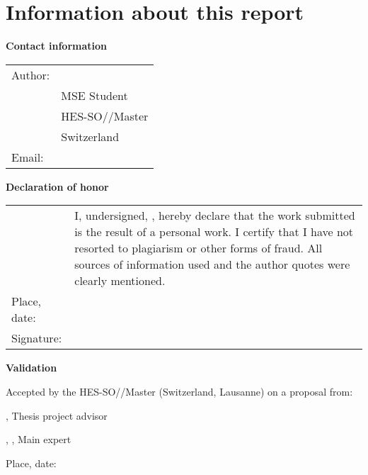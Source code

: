 \setlength{\parindent}{0pt}

\chapter*{Information about this report}

\vspace{\fill}

\textbf{Contact information}

\begin{tabularx}{\textwidth}{N{2.5cm}X}
	Author:	 & \Author \\
	& MSE Student \\
	& HES-SO//Master \\
	& Switzerland \\
	Email: & \email{\AuthorEmail}
\end{tabularx}

\vspace{\fill}

\textbf{Declaration of honor}

{\renewcommand{\arraystretch}{2}
\begin{tabularx}{\textwidth}{N{2.5cm}X}
	& I, undersigned, \Author, hereby declare that the work submitted is
	the result of a personal work. I certify that I have not resorted to
	plagiarism or other forms of fraud. All sources of information used and the
	author quotes were clearly mentioned. \\
	Place, date: & \underline{\hspace{7cm}} \\
	Signature: & \underline{\hspace{7cm}}
\end{tabularx}
}

\vspace{\fill}

\textbf{Validation}

Accepted by the HES-SO//Master (Switzerland, Lausanne) on a proposal from:

\vspace{0.5cm}

\Advisor, Thesis project advisor

\Expert, \ExpertLab, Main expert

\vspace{1cm}

Place, date: \underline{\hspace{8cm}}

\vspace{5cm}

